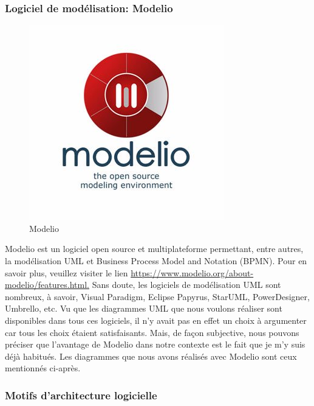\subsubsection{Logiciel de modélisation: Modelio}
\begin{figure}[h]
	\includegraphics[scale=0.5]{./Template LaTeX/Images/modelio.jpg}
	\centering
	\caption{Modelio}
\end{figure}
\newpage
Modelio est un logiciel open source et multiplateforme permettant, entre autres, la modélisation
UML et Business Process Model and Notation (BPMN). Pour en savoir plus, veuillez visiter le lien
\href{https://www.modelio.org/about-modelio/features.html.}{https://www.modelio.org/about-modelio/features.html.}
Sans doute, les logiciels de modélisation UML sont nombreux, à savoir, Visual Paradigm, Eclipse
Papyrus, StarUML, PowerDesigner, Umbrello, etc. Vu que les diagrammes UML que nous voulons
réaliser sont disponibles dans tous ces logiciels, il n’y avait pas en effet un choix à argumenter car
tous les choix étaient satisfaisants. Mais, de façon subjective, nous pouvons préciser que l’avantage de
Modelio dans notre contexte est le fait que je m’y suis déjà habitués. Les diagrammes que nous avons
réalisés avec Modelio sont ceux mentionnés ci-après.


\subsubsection{Motifs d’architecture logicielle}
